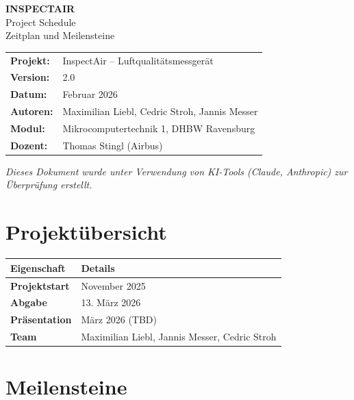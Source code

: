 \documentclass[a4paper,11pt]{article}
\begin{document}
\begin{center}
{\LARGE\textbf{INSPECTAIR}}\\[0.3cm]
{\Large Project Schedule}\\[0.3cm]
{\large Zeitplan und Meilensteine}\\[0.5cm]
\begin{tabular}{ll}
\textbf{Projekt:} & InspectAir -- Luftqualitätsmessgerät \\
\textbf{Version:} & 2.0 \\
\textbf{Datum:} & Februar 2026 \\
\textbf{Autoren:} & Maximilian Liebl, Cedric Stroh, Jannis Messer \\
\textbf{Modul:} & Mikrocomputertechnik 1, DHBW Ravensburg \\
\textbf{Dozent:} & Thomas Stingl (Airbus) \\
\end{tabular}
\end{center}

\vspace{0.5cm}
\noindent\textit{Dieses Dokument wurde unter Verwendung von KI-Tools (Claude, Anthropic) zur Überprüfung erstellt.}
\vspace{0.3cm}

\tableofcontents
\newpage

\section{Projektübersicht}

\begin{longtable}{p{4cm} p{9cm}}
\toprule
\rowcolor{tableheader}
\textbf{Eigenschaft} & \textbf{Details} \\
\midrule
\endhead
\textbf{Projektstart}   & November 2025 \\
\textbf{Abgabe}         & 13. März 2026 \\
\textbf{Präsentation}   & März 2026 (TBD) \\
\textbf{Team}            & Maximilian Liebl, Jannis Messer, Cedric Stroh \\
\bottomrule
\end{longtable}

\section{Meilensteine}
\end{document}
